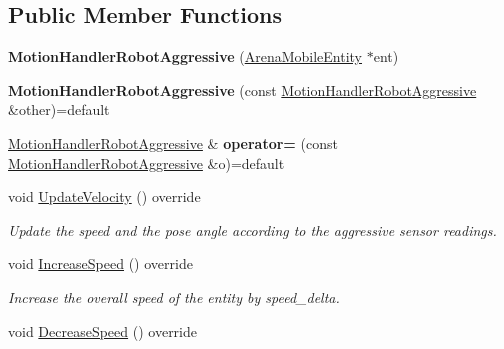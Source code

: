 \subsection*{Public Member Functions}
\begin{DoxyCompactItemize}
\item 
{\bfseries Motion\+Handler\+Robot\+Aggressive} (\hyperlink{classArenaMobileEntity}{Arena\+Mobile\+Entity} $\ast$ent)\hypertarget{classMotionHandlerRobotAggressive_acf648d0f2f208acae95758437a426299}{}\label{classMotionHandlerRobotAggressive_acf648d0f2f208acae95758437a426299}

\item 
{\bfseries Motion\+Handler\+Robot\+Aggressive} (const \hyperlink{classMotionHandlerRobotAggressive}{Motion\+Handler\+Robot\+Aggressive} \&other)=default\hypertarget{classMotionHandlerRobotAggressive_a044bb32eea5f808939acd90964b4e1c4}{}\label{classMotionHandlerRobotAggressive_a044bb32eea5f808939acd90964b4e1c4}

\item 
\hyperlink{classMotionHandlerRobotAggressive}{Motion\+Handler\+Robot\+Aggressive} \& {\bfseries operator=} (const \hyperlink{classMotionHandlerRobotAggressive}{Motion\+Handler\+Robot\+Aggressive} \&o)=default\hypertarget{classMotionHandlerRobotAggressive_a7fc4c7bc46c31da2cd51b3cbce16d1d9}{}\label{classMotionHandlerRobotAggressive_a7fc4c7bc46c31da2cd51b3cbce16d1d9}

\item 
void \hyperlink{classMotionHandlerRobotAggressive_ac8bee64034c5fbf46dfce6de36b61dbe}{Update\+Velocity} () override\hypertarget{classMotionHandlerRobotAggressive_ac8bee64034c5fbf46dfce6de36b61dbe}{}\label{classMotionHandlerRobotAggressive_ac8bee64034c5fbf46dfce6de36b61dbe}

\begin{DoxyCompactList}\small\item\em Update the speed and the pose angle according to the aggressive sensor readings. \end{DoxyCompactList}\item 
void \hyperlink{classMotionHandlerRobotAggressive_afb955c958c2b1670e023cf7b6587cce6}{Increase\+Speed} () override\hypertarget{classMotionHandlerRobotAggressive_afb955c958c2b1670e023cf7b6587cce6}{}\label{classMotionHandlerRobotAggressive_afb955c958c2b1670e023cf7b6587cce6}

\begin{DoxyCompactList}\small\item\em Increase the overall speed of the entity by speed\+\_\+delta. \end{DoxyCompactList}\item 
void \hyperlink{classMotionHandlerRobotAggressive_a3f356f4caa6bdbed06c951f27a5cad76}{Decrease\+Speed} () override\hypertarget{classMotionHandlerRobotAggressive_a3f356f4caa6bdbed06c951f27a5cad76}{}\label{classMotionHandlerRobotAggressive_a3f356f4caa6bdbed06c951f27a5cad76}


\end{DoxyCompactItemize}
